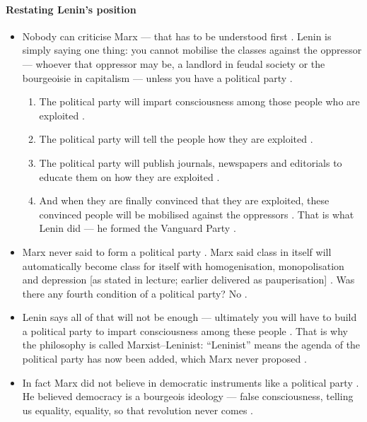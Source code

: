 \paragraph{Restating Lenin's position}
\begin{itemize}
    \item Nobody can criticise Marx --- that has to be understood first . Lenin is simply saying one thing: you cannot mobilise the classes against the oppressor --- whoever that oppressor may be, a landlord in feudal society or the bourgeoisie in capitalism --- unless you have a political party .
    \begin{enumerate}
        \item The political party will impart consciousness among those people who are exploited .
        \item The political party will tell the people how they are exploited .
        \item The political party will publish journals, newspapers and editorials to educate them on how they are exploited .
        \item And when they are finally convinced that they are exploited, these convinced people will be mobilised against the oppressors . That is what Lenin did --- he formed the Vanguard Party .
    \end{enumerate}
    \item Marx never said to form a political party . Marx said class in itself will automatically become class for itself with homogenisation, monopolisation and depression [as stated in lecture; earlier delivered as pauperisation] . Was there any fourth condition of a political party? No .
    \item Lenin says all of that will not be enough --- ultimately you will have to build a political party to impart consciousness among these people . That is why the philosophy is called Marxist--Leninist: ``Leninist'' means the agenda of the political party has now been added, which Marx never proposed .
    \item In fact Marx did not believe in democratic instruments like a political party . He believed democracy is a bourgeois ideology --- false consciousness, telling us equality, equality, so that revolution never comes .
\end{itemize}

